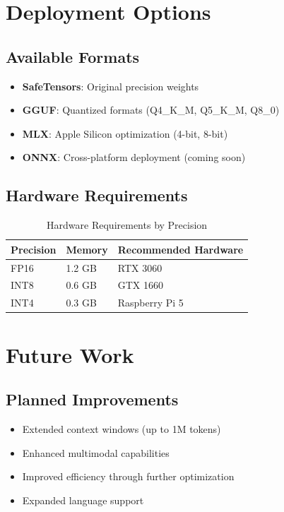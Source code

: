 \documentclass[11pt,a4paper]{article}
\begin{document}
\section{Deployment Options}

\subsection{Available Formats}
\begin{itemize}
    \item \textbf{SafeTensors}: Original precision weights
    \item \textbf{GGUF}: Quantized formats (Q4\_K\_M, Q5\_K\_M, Q8\_0)
    \item \textbf{MLX}: Apple Silicon optimization (4-bit, 8-bit)
    \item \textbf{ONNX}: Cross-platform deployment (coming soon)
\end{itemize}

\subsection{Hardware Requirements}
\begin{table}[H]
\centering
\begin{tabular}{lll}
\toprule
\textbf{Precision} & \textbf{Memory} & \textbf{Recommended Hardware} \\
\midrule
FP16 & 1.2 GB & RTX 3060 \\
INT8 & 0.6 GB & GTX 1660 \\
INT4 & 0.3 GB & Raspberry Pi 5 \\
\bottomrule
\end{tabular}
\caption{Hardware Requirements by Precision}
\end{table}

\section{Future Work}

\subsection{Planned Improvements}
\begin{itemize}
    \item Extended context windows (up to 1M tokens)
    \item Enhanced multimodal capabilities
    \item Improved efficiency through further optimization
    \item Expanded language support
\end{itemize}
\end{document}

